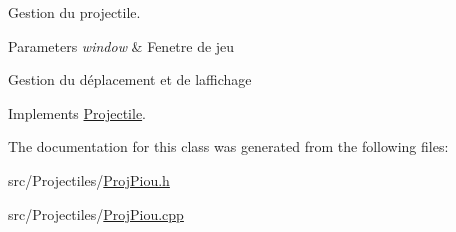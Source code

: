Gestion du projectile. 


\begin{DoxyParams}{Parameters}
{\em window} & Fenetre de jeu\\
\hline
\end{DoxyParams}
Gestion du déplacement et de l\textquotesingle{}affichage 

Implements \mbox{\hyperlink{class_projectile_ad8fae955389ff8944830e9d80e0f1ce1}{Projectile}}.



The documentation for this class was generated from the following files\+:\begin{DoxyCompactItemize}
\item 
src/\+Projectiles/\mbox{\hyperlink{_proj_piou_8h}{Proj\+Piou.\+h}}\item 
src/\+Projectiles/\mbox{\hyperlink{_proj_piou_8cpp}{Proj\+Piou.\+cpp}}\end{DoxyCompactItemize}
